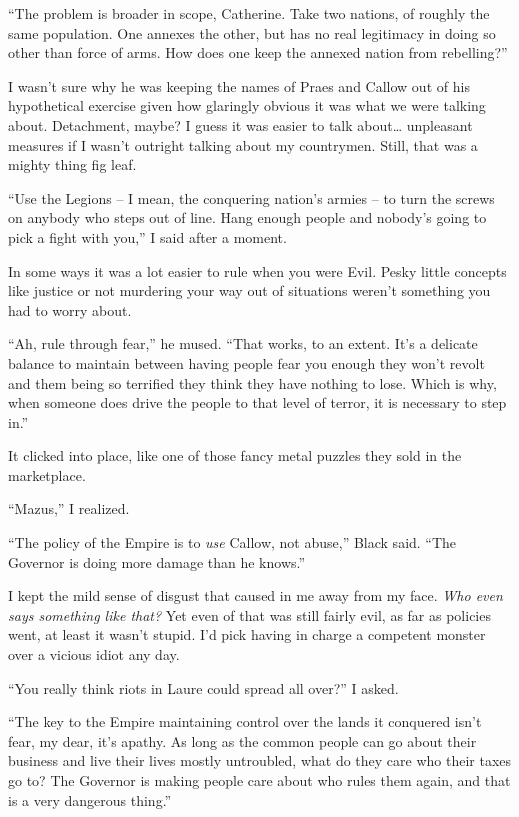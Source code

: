 \documentclass[12pt, openany]{book}
\begin{document}
“The problem is broader in scope, Catherine. Take two nations, of roughly the same population. One annexes the other, but has no real legitimacy in doing so other than force of arms. How does one keep the annexed nation from rebelling?”

I wasn’t sure why he was keeping the names of Praes and Callow out of his hypothetical exercise given how glaringly obvious it was what we were talking about. Detachment, maybe? I guess it was easier to talk about… unpleasant measures if I wasn’t outright talking about my countrymen. Still, that was a mighty thing fig leaf.

“Use the Legions – I mean, the conquering nation’s armies – to turn the screws on anybody who steps out of line. Hang enough people and nobody’s going to pick a fight with you,” I said after a moment.

In some ways it was a lot easier to rule when you were Evil. Pesky little concepts like justice or not murdering your way out of situations weren’t something you had to worry about.

“Ah, rule through fear,” he mused. “That works, to an extent. It’s a delicate balance to maintain between having people fear you enough they won’t revolt and them being so terrified they think they have nothing to lose. Which is why, when someone does drive the people to that level of terror, it is necessary to step in.”

It clicked into place, like one of those fancy metal puzzles they sold in the marketplace.

“Mazus,” I realized.

“The policy of the Empire is to \textit{use} Callow, not abuse,” Black said. “The Governor is doing more damage than he knows.”

I kept the mild sense of disgust that caused in me away from my face. \textit{Who even says something like that?} Yet even of that was still fairly evil, as far as policies went, at least it wasn’t stupid. I’d pick having in charge a competent monster over a vicious idiot any day.

“You really think riots in Laure could spread all over?” I asked.

“The key to the Empire maintaining control over the lands it conquered isn’t fear, my dear, it’s apathy. As long as the common people can go about their business and live their lives mostly untroubled, what do they care who their taxes go to? The Governor is making people care about who rules them again, and that is a very dangerous thing.”
\end{document}
